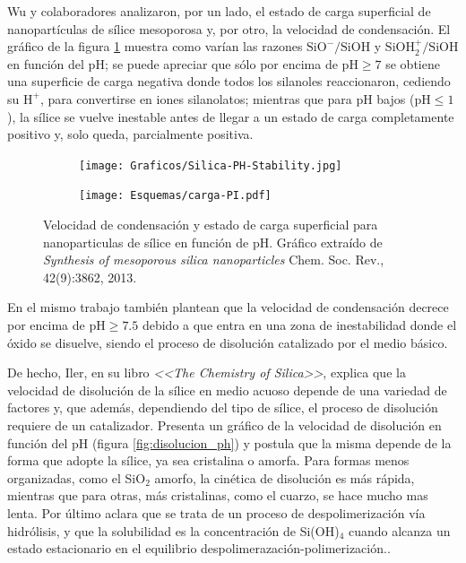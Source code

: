 	Wu y colaboradores\cite{Si-HanWu2013} analizaron, por un lado, el estado de carga superficial de nanopartículas de sílice mesoporosa y, por otro, la velocidad de condensación. El gráfico de la figura \ref{fig:silica_ph} muestra como varían las razones  $\text{SiO}^{-}/\text{SiOH}$ y $\text{SiOH}_2^{+}/\text{SiOH}$ en función del pH; se puede apreciar que sólo por encima de $\text{pH}\geq7$ se obtiene una superficie de carga negativa donde todos los silanoles reaccionaron, cediendo su $\text{H}^{+}$, para convertirse en iones silanolatos; mientras que para pH bajos ($\text{pH}\leq1$), la sílice se vuelve inestable antes de llegar a un estado de carga completamente positivo y, solo queda, parcialmente positiva. 
		\begin{figure}[bh!]
			\begin{subfigure}[t]{0.73\textwidth}
 	       	\texttt{[image: Graficos/Silica-PH-Stability.jpg]}
 	       	\end{subfigure}
 	       	\begin{subfigure}[t]{0.25\textwidth}
 	       	 	\texttt{[image: Esquemas/carga-PI.pdf]}
	      	 \end{subfigure}
	    	\caption[Velocidad de condensación y estado de carga superficial]{Velocidad de condensación y estado de carga superficial para nanoparticulas de sílice en función de pH. Gráfico extraído de \textit{Synthesis of mesoporous silica nanoparticles} Chem. Soc. Rev., 42(9):3862, 2013.\cite{Si-HanWu2013}}
	       	\label{fig:silica_ph}
	    	\end{figure}
	En el mismo trabajo\cite{Si-HanWu2013} también plantean que la velocidad de condensación decrece por encima de $\text{pH}\geq7.5$ debido a que entra en una zona de inestabilidad donde el óxido se disuelve, siendo el proceso de disolución catalizado por el medio básico.
	    	
	De hecho, Iler, en su libro \textit{<<The Chemistry of Silica>>}, explica que la velocidad de disolución de la sílice en medio acuoso depende de una variedad de factores y, que además, dependiendo del tipo de sílice, el proceso de disolución requiere de un catalizador. Presenta un gráfico de la velocidad de disolución en función del pH (figura \ref{fig:disolucion_ph}) y postula que la misma depende de la forma que adopte la sílice, ya sea cristalina o amorfa. Para formas menos organizadas, como el SiO$_2$ amorfo, la cinética de disolución es más rápida, mientras que para otras, más cristalinas, como el cuarzo, se hace mucho mas lenta. Por último aclara que se trata de un proceso de despolimerización vía hidrólisis, y que la solubilidad es la concentración de Si(OH)$_4$ cuando alcanza un estado estacionario en el equilibrio despolimerazación-polimerización.\cite{iler1979,blesa1994}. 

